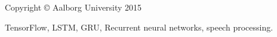 \thispagestyle{empty}
{\small
\strut\vfill %
\noindent Copyright \copyright{} Aalborg University 2015\par
\vspace{0.2cm}
\noindent TensorFlow, LSTM, GRU, Recurrent neural networks, speech processing.
}
\clearpage

